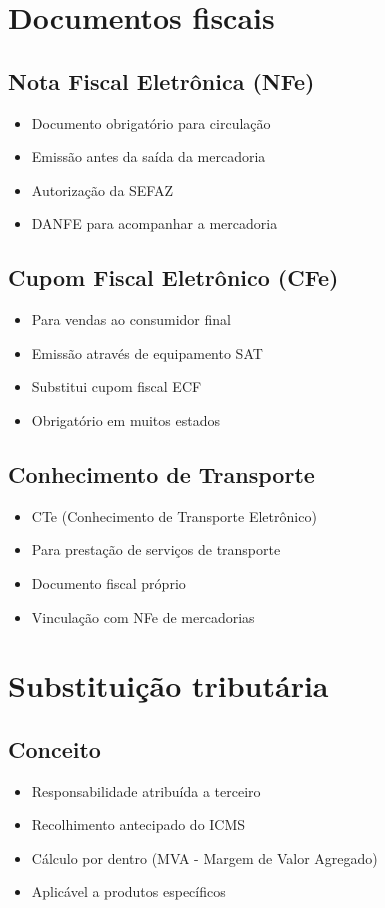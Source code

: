 \documentclass[12pt,a4paper]{article}
\begin{document}
\section{Documentos fiscais}

\subsection{Nota Fiscal Eletrônica (NFe)}
\begin{itemize}
    \item Documento obrigatório para circulação
    \item Emissão antes da saída da mercadoria
    \item Autorização da SEFAZ
    \item DANFE para acompanhar a mercadoria
\end{itemize}

\subsection{Cupom Fiscal Eletrônico (CFe)}
\begin{itemize}
    \item Para vendas ao consumidor final
    \item Emissão através de equipamento SAT
    \item Substitui cupom fiscal ECF
    \item Obrigatório em muitos estados
\end{itemize}

\subsection{Conhecimento de Transporte}
\begin{itemize}
    \item CTe (Conhecimento de Transporte Eletrônico)
    \item Para prestação de serviços de transporte
    \item Documento fiscal próprio
    \item Vinculação com NFe de mercadorias
\end{itemize}

\section{Substituição tributária}

\subsection{Conceito}
\begin{itemize}
    \item Responsabilidade atribuída a terceiro
    \item Recolhimento antecipado do ICMS
    \item Cálculo por dentro (MVA - Margem de Valor Agregado)
    \item Aplicável a produtos específicos
\end{itemize}
\end{document}
